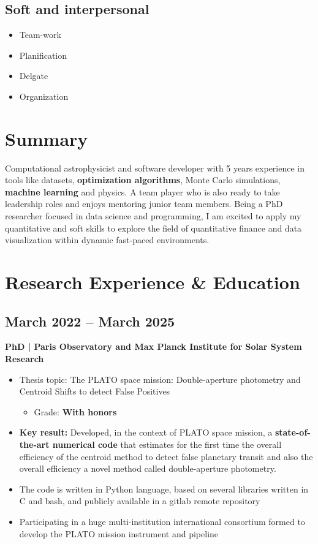 \documentclass[11pt,a4paper]{article}
\begin{document}
\begin{multicols}{2}
		\subsection{Soft and interpersonal}
		
		\begin{itemize}
			\item Team-work
			\item Planification
			\item Delgate
			\item Organization
		\end{itemize}
		
		\section{Summary}
		Computational astrophysicist and software developer with 5 years experience in tools like datasets, \textbf{optimization algorithms}, Monte Carlo simulations, \textbf{machine learning} and physics. A team player who is also ready to take leadership roles and enjoys mentoring junior team members. Being a PhD researcher focused in data science and programming, I am excited to apply my quantitative and soft skills to explore the field of quantitative finance and data visualization within dynamic fast-paced environments.
		
		\section{Research Experience \& Education}
		
		
		\subsection{March 2022 – March 2025}
		\textbf{PhD | Paris Observatory and Max Planck Institute for Solar System Research}
		\begin{itemize}
			\item Thesis topic: The PLATO space mission: Double-aperture photometry and Centroid Shifts to detect False Positives
			\begin{itemize}
				\item Grade: \textbf{With honors}
			\end{itemize}
			\item \textbf{Key result:} Developed, in the context of PLATO space mission, a \textbf{state-of-the-art numerical code} that estimates for the first time the overall efficiency of the centroid method to detect false planetary transit and also the overall efficiency a novel method called double-aperture photometry.
			\item The code is written in Python language, based on several libraries written in C and bash, and publicly available in a gitlab remote repository
			\item Participating in a huge multi-institution international consortium formed to develop the PLATO mission instrument and pipeline
		\end{itemize}
		

\end{multicols}
\end{document}
